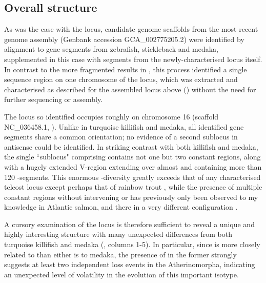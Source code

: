 \subsection{Overall structure}
\label{sec:xma-locus-structure}
	
As was the case with the \Nfu \igh{} locus, candidate genome scaffolds from the most recent \xma genome assembly (Genbank accession GCA\_002775205.2) were identified by alignment to \igh{} gene segments from zebrafish, stickleback and medaka, supplemented in this case with segments from the newly-characterised \Nfu locus itself. In contrast to the more fragmented results in \Nfu, this process identified a single sequence region on one chromosome of the \Xma locus, which was extracted and characterised as described for the assembled \Nfu locus above () without the need for further sequencing or assembly.

The \Xma \igh{} locus so identified occupies roughly  on chromosome 16 (scaffold NC\_036458.1, ). Unlike in turquoise killifish and medaka, all identified gene segments share a common orientation; no evidence of a second sublocus in antisense could be identified. In striking contrast with both killifish and medaka, the single ``sublocus" comprising \Xma \igh{} contains not one but two  constant regions, along with a hugely extended V-region extending over almost  and containing more than 120 \vh-segments. This enormous \vh-diversity greatly exceeds that of any characterised teleost \igh{} locus except perhaps that of rainbow trout \parencite{bengten2015fishantibodies}, while the presence of multiple  constant regions without intervening  or  has previously only been observed to my knowledge in Atlantic salmon, and there in a very different configuration \parencite{fillatreau2013astonishing}.

A cursory examination of the \Xma \igh{} locus is therefore sufficient to reveal a unique and highly interesting structure with many unexpected differences from both turquoise killifish and medaka (, columns 1-5). In particular, since \Xma is more closely related to \Nfu than either is to medaka, the presence of  in the former strongly suggests at least two independent loss events in the Atherinomorpha, indicating an unexpected level of volatility in the evolution of this important isotype.
 
